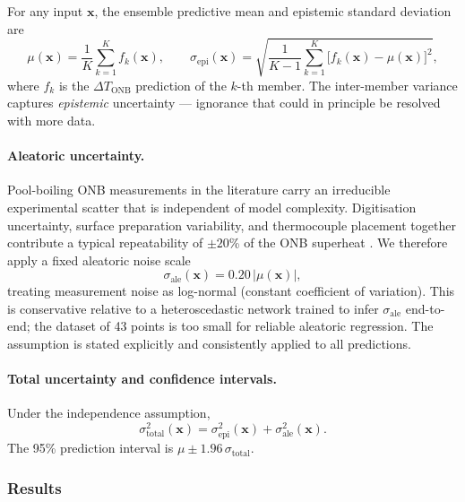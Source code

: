 For any input $\mathbf{x}$, the ensemble predictive mean and epistemic
standard deviation are
\begin{equation}
  \mu(\mathbf{x}) = \frac{1}{K}\sum_{k=1}^{K} f_k(\mathbf{x}),
  \qquad
  \sigma_\mathrm{epi}(\mathbf{x}) = \sqrt{\frac{1}{K-1}\sum_{k=1}^{K}
    \bigl[f_k(\mathbf{x}) - \mu(\mathbf{x})\bigr]^2},
\end{equation}
where $f_k$ is the $\Delta T_\mathrm{ONB}$ prediction of the $k$-th member.
The inter-member variance captures \emph{epistemic} uncertainty — ignorance
that could in principle be resolved with more data.

\paragraph{Aleatoric uncertainty.}
Pool-boiling ONB measurements in the literature carry an irreducible
experimental scatter that is independent of model complexity.  Digitisation
uncertainty, surface preparation variability, and thermocouple placement
together contribute a typical repeatability of $\pm 20$\% of the ONB
superheat \citep{basu2002,jones2009}.  We therefore apply a fixed aleatoric
noise scale
\begin{equation}
  \sigma_\mathrm{ale}(\mathbf{x}) = 0.20\,\bigl|\mu(\mathbf{x})\bigr|,
\end{equation}
treating measurement noise as log-normal (constant coefficient of variation).
This is conservative relative to a heteroscedastic network trained to infer
$\sigma_\mathrm{ale}$ end-to-end; the dataset of 43 points is too small for
reliable aleatoric regression.  The assumption is stated explicitly and
consistently applied to all predictions.

\paragraph{Total uncertainty and confidence intervals.}
Under the independence assumption,
\begin{equation}
  \sigma_\mathrm{total}^2(\mathbf{x})
    = \sigma_\mathrm{epi}^2(\mathbf{x}) + \sigma_\mathrm{ale}^2(\mathbf{x}).
\end{equation}
The 95\% prediction interval is
$\mu \pm 1.96\,\sigma_\mathrm{total}$.

\subsubsection{Results}

